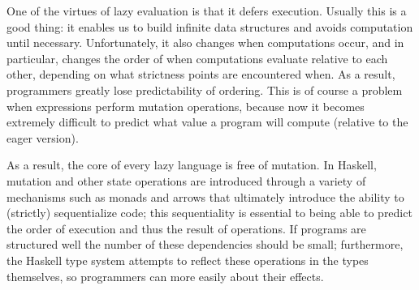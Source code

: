 
One of the virtues of lazy evaluation is that it defers execution. Usually this
is a good thing: it enables us to build infinite data structures and avoids
computation until necessary. Unfortunately, it also changes when computations
occur, and in particular, changes the order of when computations evaluate
relative to each other, depending on what strictness points are encountered
when. As a result, programmers greatly lose predictability of ordering. This is
of course a problem when expressions perform mutation operations, because now it
becomes extremely difficult to predict what value a program will compute
(relative to the eager version).

As a result, the core of every lazy language is free of mutation. In Haskell,
mutation and other state operations are introduced through a variety of
mechanisms such as monads and arrows that ultimately introduce the ability to
(strictly) sequentialize code; this sequentiality is essential to being able to
predict the order of execution and thus the result of operations. If programs
are structured well the number of these dependencies should be small;
furthermore, the Haskell type system attempts to reflect these operations in the
types themselves, so programmers can more easily about their effects.
